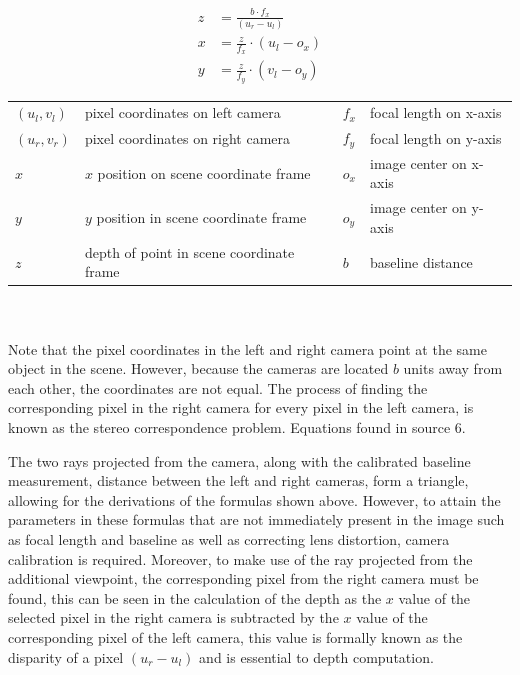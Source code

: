 \documentclass[11pt]{scrartcl}
\begin{document}
\begin{theorem}
	[Backward Projection Equations]
	
	\begin{align}
		z & = \displaystyle\frac{b\cdot f_x}{(u_r-u_l)}    \\
		x & = \displaystyle\frac{z}{f_x} \cdot (u_l - o_x) \\
		y & = \displaystyle\frac{z}{f_y} \cdot (v_l - o_y) 
	\end{align}
	
	\begin{figurekey}
		\begin{tabular}{llll}
			$(u_l,v_l)$ & pixel coordinates on left camera         & $f_x$ & focal length on x-axis \\
			$(u_r,v_r)$ & pixel coordinates on right camera        & $f_y$ & focal length on y-axis \\
			$x$         & $x$ position on scene coordinate frame   & $o_x$ & image center on x-axis \\
			$y$         & $y$ position in scene coordinate frame   & $o_y$ & image center on y-axis \\
			$z$         & depth of point in scene coordinate frame & $b$   & baseline distance      \\
		\end{tabular}
	\end{figurekey} \\ \\
	Note that the pixel coordinates in the left and right camera point at the same object in 
	the scene. However, because the cameras are located $b$ units away from each other, 
	the coordinates are not equal. The process of finding the corresponding pixel in the 
	right camera for every pixel in the left camera, is known as the stereo correspondence 
	problem. Equations found in source 6. 
\end{theorem}

The two rays projected from the camera, along with the calibrated baseline measurement, distance between the left and right cameras, form a triangle, allowing for the derivations of the formulas
shown above. However, to attain the parameters in these formulas that are not immediately present in the image such as focal length and baseline as well as correcting lens distortion, camera calibration is required. Moreover, to make use of the ray projected from the additional viewpoint, the corresponding pixel from the right camera must be 
found, this can be seen in the calculation of the depth as the $x$ value of the selected pixel in the right camera is subtracted by the $x$ value of the corresponding pixel of the left camera, this value is formally known as the disparity of a pixel $(u_r-u_l)$ and is essential to depth computation. 
\end{document}
